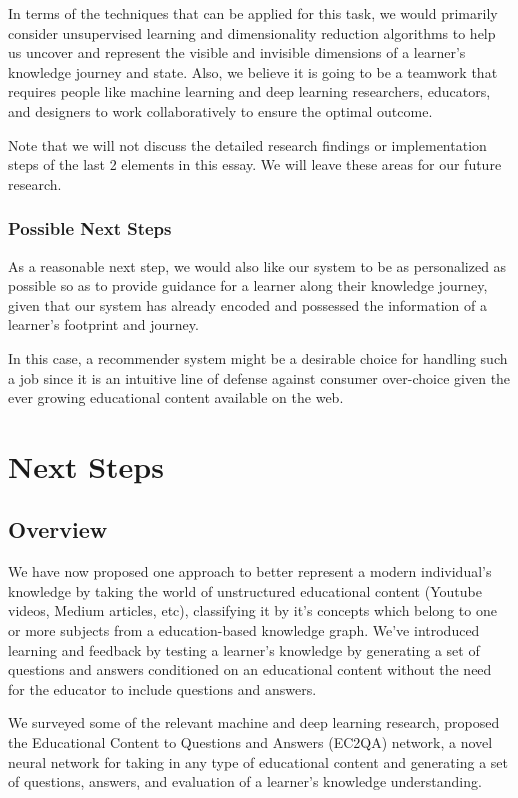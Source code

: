 \documentclass{acm_proc_article-sp}
\begin{document}
In terms of the techniques that can be applied for this task, we would
primarily consider unsupervised learning and dimensionality reduction
algorithms to help us uncover and represent the visible and invisible
dimensions of a learner's knowledge journey and state. Also, we believe
it is going to be a teamwork that requires people like machine learning
and deep learning researchers, educators, and designers to work
collaboratively to ensure the optimal outcome.

Note that we will not discuss the detailed research findings or
implementation steps of the last 2 elements in this essay. We will leave
these areas for our future research.

\subsection{Possible Next Steps}\label{possible-next-steps-1}

As a reasonable next step, we would also like our system to be as
personalized as possible so as to provide guidance for a learner along
their knowledge journey, given that our system has already encoded and
possessed the information of a learner's footprint and journey.

In this case, a recommender system might be a desirable choice for
handling such a job since it is an intuitive line of defense against
consumer over-choice given the ever growing educational content
available on the web.

\chapter{Next Steps}\label{next-steps}

\section{Overview}\label{overview}

We have now proposed one approach to better represent a modern
individual's knowledge by taking the world of unstructured educational
content (Youtube videos, Medium articles, etc), classifying it by it's
concepts which belong to one or more subjects from a education-based
knowledge graph. We've introduced learning and feedback by testing a
learner's knowledge by generating a set of questions and answers
conditioned on an educational content without the need for the educator
to include questions and answers.

We surveyed some of the relevant machine and deep learning research,
proposed the Educational Content to Questions and Answers (EC2QA)
network, a novel neural network for taking in any type of educational
content and generating a set of questions, answers, and evaluation of a
learner's knowledge understanding.
\end{document}
